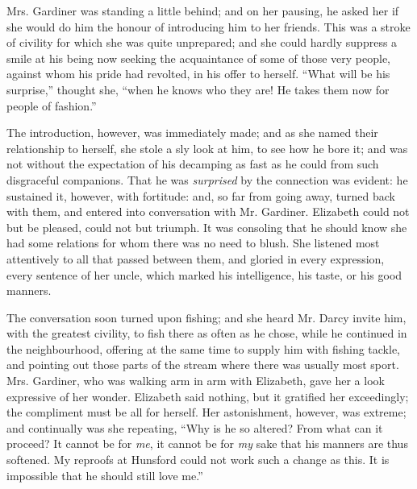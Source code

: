 \documentclass[12pt,openright]{book}
\begin{document}
Mrs. Gardiner was standing a little behind; and on her pausing, he asked her if she would do him the honour of introducing him to her friends. This was a stroke of civility for which she was quite unprepared; and she could hardly suppress a smile at his being now seeking the acquaintance of some of those very people, against whom his pride had revolted, in his offer to herself. “What will be his surprise,” thought she, “when he knows who they are! He takes them now for people of fashion.”

The introduction, however, was immediately made; and as she named their relationship to herself, she stole a sly look at him, to see how he bore it; and was not without the expectation of his decamping as fast as he could from such disgraceful companions. That he was \textit{surprised} by the connection was evident: he sustained it, however, with fortitude: and, so far from going away, turned back with them, and entered into conversation with Mr. Gardiner. Elizabeth could not but be pleased, could not but triumph. It was consoling that he should know she had some relations for whom there was no need to blush. She listened most attentively to all that passed between them, and gloried in every expression, every sentence of her uncle, which marked his intelligence, his taste, or his good manners.

The conversation soon turned upon fishing; and she heard Mr. Darcy invite him, with the greatest civility, to fish there as often as he chose, while he continued in the neighbourhood, offering at the same time to supply him with fishing tackle, and pointing out those parts of the stream where there was usually most sport. Mrs. Gardiner, who was walking arm in arm with Elizabeth, gave her a look expressive of her wonder. Elizabeth said nothing, but it gratified her exceedingly; the compliment must be all for herself. Her astonishment, however, was extreme; and continually was she repeating, “Why is he so altered? From what can it proceed? It cannot be for \textit{me}, it cannot be for \textit{my} sake that his manners are thus softened. My reproofs at Hunsford could not work such a change as this. It is impossible that he should still love me.”
\end{document}
